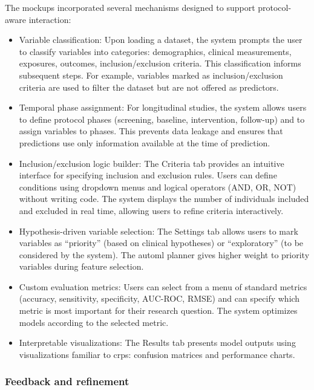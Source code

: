\documentclass[twoside,final]{Contexto}
\begin{document}
The mockups incorporated several mechanisms designed to support protocol-aware interaction:

\begin{itemize}
    \item Variable classification: Upon loading a dataset, the system prompts the user to classify variables into categories: demographics, clinical measurements, exposures, outcomes, inclusion/exclusion criteria. This classification informs subsequent steps. For example, variables marked as inclusion/exclusion criteria are used to filter the dataset but are not offered as predictors.

    \item Temporal phase assignment: For longitudinal studies, the system allows users to define protocol phases (screening, baseline, intervention, follow-up) and to assign variables to phases. This prevents data leakage and ensures that predictions use only information available at the time of prediction.

    \item Inclusion/exclusion logic builder: The Criteria tab provides an intuitive interface for specifying inclusion and exclusion rules. Users can define conditions using dropdown menus and logical operators (AND, OR, NOT) without writing code. The system displays the number of individuals included and excluded in real time, allowing users to refine criteria interactively.

    \item Hypothesis-driven variable selection: The Settings tab allows users to mark variables as ``priority'' (based on clinical hypotheses) or ``exploratory'' (to be considered by the system). The \gls{automl} planner gives higher weight to priority variables during feature selection.

    \item Custom evaluation metrics: Users can select from a menu of standard metrics (accuracy, sensitivity, specificity, AUC-ROC, RMSE) and can specify which metric is most important for their research question. The system optimizes models according to the selected metric.

    \item Interpretable visualizations: The Results tab presents model outputs using visualizations familiar to \glspl{crp}: confusion matrices and performance charts.
\end{itemize}

\subsubsection{Feedback and refinement}
\end{document}
